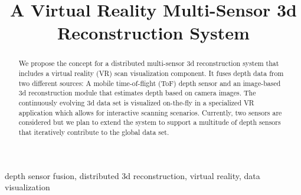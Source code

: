 \documentclass[conference]{IEEEtran}
\begin{document}
\title{A Virtual Reality Multi-Sensor 3d Reconstruction System}

\author{
}

\maketitle

\begin{abstract}
We propose the concept for a distributed multi-sensor 3d reconstruction system that includes a virtual reality (VR) scan visualization component. It fuses depth data from two different sources: A mobile time-of-flight (ToF) depth sensor and an image-based 3d reconstruction module that estimates depth based on camera images.
The continuously evolving 3d data set is visualized on-the-fly in a specialized VR application which allows for interactive scanning scenarios.
Currently, two sensors are considered but we plan to extend the system to support a multitude of depth sensors that iteratively contribute to the global data set.  
\end{abstract}

\begin{IEEEkeywords}
depth sensor fusion, distributed 3d reconstruction, virtual reality, data visualization
\end{IEEEkeywords}
\end{document}
